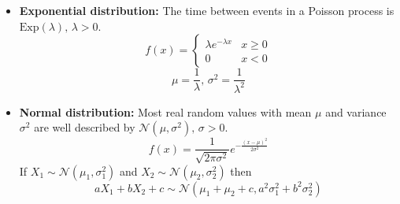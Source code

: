 \begin{itemize}
\begin{itemize}
        \item \textbf{Exponential distribution:} The time between events in a Poisson process is $\textrm{Exp}(\lambda),\,\lambda>0$.
        \[f(x) = \left\{
        \begin{array}{cl}
        \lambda e^{-\lambda x} & x\geq0\\
        0 & x<0
        \end{array}\right.\]
        \[\mu=\frac{1}{\lambda},\,\sigma^2=\frac{1}{\lambda^2}\]

        \item \textbf{Normal distribution:} Most real random values with mean $\mu$ and variance $\sigma^2$ are well described by $\mathcal{N}(\mu,\sigma^2),\,\sigma>0$.
        \[ f(x) = \frac{1}{\sqrt{2\pi\sigma^2}}e^{-\frac{(x-\mu)^2}{2\sigma^2}} \]
        If $X_1 \sim \mathcal{N}(\mu_1,\sigma_1^2)$ and $X_2 \sim \mathcal{N}(\mu_2,\sigma_2^2)$ then
        \[ aX_1 + bX_2 + c \sim \mathcal{N}(\mu_1+\mu_2+c,a^2\sigma_1^2+b^2\sigma_2^2) \]
    \end{itemize}
\end{itemize}